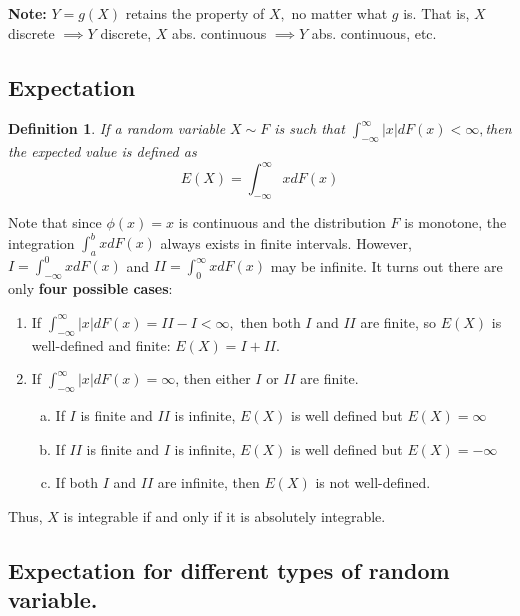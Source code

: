 \documentclass[12pt]{report} \addtolength{\textheight}{2in}
\newtheorem{defn}{Definition}
\newcommand{\totalint}{\int_{-\infty}^{\infty}}
\begin{document}
\textbf{Note:} $Y=g(X)$ retains the property of $X,$ no matter what $g$ is. That is, $X$ discrete $\implies Y$ discrete, $X$ abs. continuous $\implies Y$ abs. continuous, etc.

\subsection*{Expectation}
\begin{defn}
If a random variable $X \sim F$ is such that $\totalint |x| d F(x) < \infty,$then the expected value is defined as 
\begin{displaymath}
E(X)=\totalint x dF(x)
\end{displaymath}
\end{defn}
Note that since $\phi(x)=x$ is continuous and the distribution $F$ is monotone, the integration $\int_{a}^{b} x dF(x)$ always exists in finite intervals. However, $I=\int_{-\infty}^{0} xdF(x) $ and $II=\int_{0}^{\infty} x dF(x)$ may be infinite. It turns out there are only \textbf{four possible cases}:
\begin{enumerate}[(1)]
\item If $\totalint |x| dF(x)=II-I < \infty,$ then both $I$ and $II$ are finite, so $E(X)$ is well-defined and finite: $E(X) = I + II$. 

\item If $\totalint |x| dF(x)=\infty$, then either $I$ or $II$ are finite. 
\begin{enumerate}[(a)]
\item If $I$ is finite and $II$ is infinite, $E(X)$ is well defined but $E(X)=\infty$
\item If $II$ is finite and $I$ is infinite, $E(X)$ is well defined but $E(X)=-\infty$
\item If both $I$ and $II$ are infinite, then $E(X)$ is not well-defined.
\end{enumerate}
\end{enumerate}
Thus, $X$ is integrable if and only if it is absolutely integrable.\\


\subsection*{Expectation for different types of random variable.}
\end{document}
